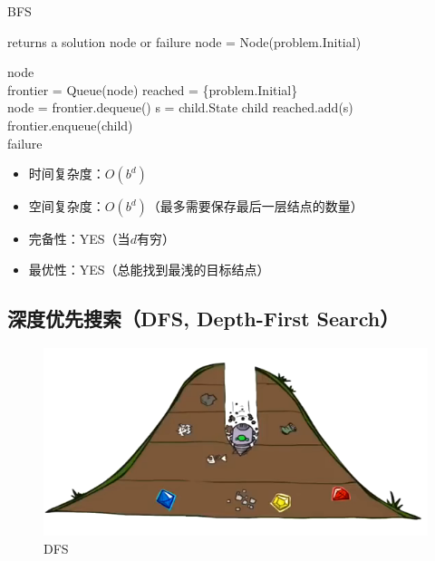 \begin{algorithm}[H]
    \caption{BFS}
    \begin{algorithmic}[1]
         returns a solution node or failure
        \State node = Node(problem.Initial)

        \State \Return node
        \EndIf
        \\
        \State frontier = Queue(node)
        \State reached = \{problem.Initial\}
        \\
        \State node = frontier.dequeue()
        \State s = child.State
        \State \Return child
        \EndIf
        \State reached.add(s)
        \State frontier.enqueue(child)
        \EndIf
        \EndFor
        \EndWhile
        \\
        \State \Return failure
        \EndProcedure
    \end{algorithmic}
\end{algorithm}

\begin{itemize}
    \item 时间复杂度：$ O(b^d) $
    \item 空间复杂度：$ O(b^d) $（最多需要保存最后一层结点的数量）
    \item 完备性：YES（当$ d $有穷）
    \item 最优性：YES（总能找到最浅的目标结点）
\end{itemize}

\vspace{0.5cm}

\subsection{深度优先搜索（DFS, Depth-First Search）}

\begin{figure}[H]
    \centering
    \includegraphics{img/C1/1-4/2.png}
    \caption{DFS}
\end{figure}

